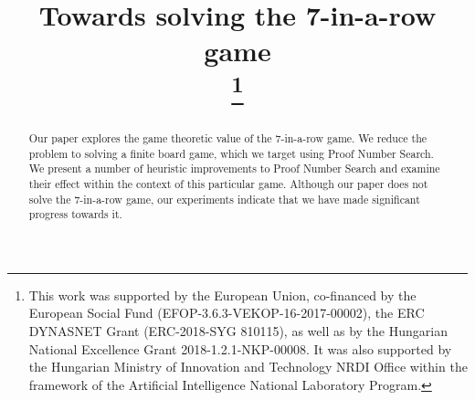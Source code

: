\documentclass[conference]{IEEEtran}
\theoremstyle{definition}
\begin{document}
\IEEEoverridecommandlockouts
{}

\title{Towards solving the 7-in-a-row game\\
\thanks{This work was supported by the European Union, co-financed by
  the European Social Fund (EFOP-3.6.3-VEKOP-16-2017-00002), the ERC DYNASNET Grant (ERC-2018-SYG 810115), as well as by the Hungarian National Excellence Grant
  2018-1.2.1-NKP-00008. It was also supported by the Hungarian Ministry of
  Innovation and Technology NRDI Office within the framework of the
  Artificial Intelligence National Laboratory Program.}
}


\author{
\and
{}
\and
{}
\and
{}
}

\maketitle

\begin{abstract}
Our paper explores the game theoretic value of the 7-in-a-row game. We reduce the problem to solving a finite board game, which we target using Proof Number Search. We present a number of heuristic improvements to Proof Number Search and examine their effect within the context of this particular game. Although our paper does not solve the 7-in-a-row game, our experiments indicate that we have made significant progress towards it.
\end{abstract}
\end{document}
